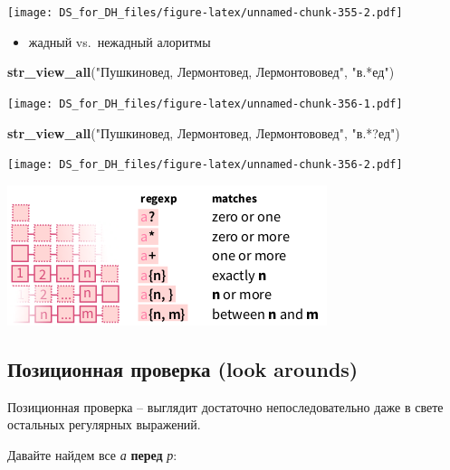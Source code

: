 \documentclass[
]{book}
\newenvironment{Shaded}{\begin{snugshade}}{\end{snugshade}}
\newcommand{\KeywordTok}[1]{\textcolor[rgb]{0.13,0.29,0.53}{\textbf{#1}}}
\newcommand{\NormalTok}[1]{#1}
\newcommand{\StringTok}[1]{\textcolor[rgb]{0.31,0.60,0.02}{#1}}
\providecommand{\tightlist}{%
  \setlength{\itemsep}{0pt}\setlength{\parskip}{0pt}}
\begin{document}
\texttt{[image: DS\_for\_DH\_files/figure-latex/unnamed-chunk-355-2.pdf]}

\begin{itemize}
\tightlist
\item
  жадный vs.~нежадный алоритмы
\end{itemize}

\begin{Shaded}
\begin{Highlighting}[]
\KeywordTok{str_view_all}\NormalTok{(}\StringTok{"Пушкиновед, Лермонтовед, Лермонтововед"}\NormalTok{, }\StringTok{"в.*ед"}\NormalTok{)}
\end{Highlighting}
\end{Shaded}

\texttt{[image: DS\_for\_DH\_files/figure-latex/unnamed-chunk-356-1.pdf]}

\begin{Shaded}
\begin{Highlighting}[]
\KeywordTok{str_view_all}\NormalTok{(}\StringTok{"Пушкиновед, Лермонтовед, Лермонтововед"}\NormalTok{, }\StringTok{"в.*?ед"}\NormalTok{)}
\end{Highlighting}
\end{Shaded}

\texttt{[image: DS\_for\_DH\_files/figure-latex/unnamed-chunk-356-2.pdf]}

\includegraphics{images/5.15_quantifiers.png}

\hypertarget{ux43fux43eux437ux438ux446ux438ux43eux43dux43dux430ux44f-ux43fux440ux43eux432ux435ux440ux43aux430-look-arounds}{%
\subsection{Позиционная проверка (look arounds)}\label{ux43fux43eux437ux438ux446ux438ux43eux43dux43dux430ux44f-ux43fux440ux43eux432ux435ux440ux43aux430-look-arounds}}

Позиционная проверка -- выглядит достаточно непоследовательно даже в свете остальных регулярных выражений.

Давайте найдем все \emph{а} \textbf{перед} \emph{р}:
\end{document}

